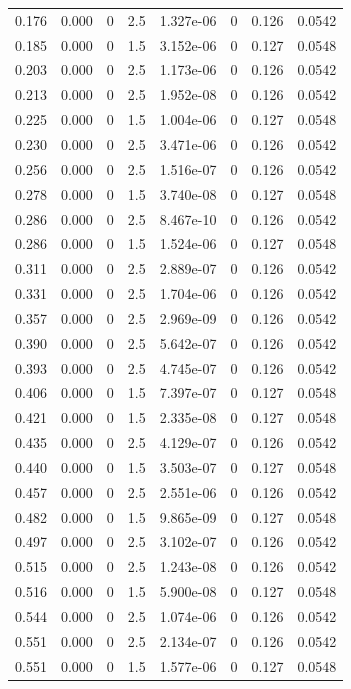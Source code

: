 \documentclass[preview]{standalone}
\begin{document}
{{\begin{tabular}{L{1.2cm}C{1.2cm} C{0.3cm}C{0.5cm} C{1.4cm}C{1.4cm} C{1.4cm}C{1.4cm}}
  0.176  &  0.000  & 0     & 2.5 &  1.327e-06  & 0  & 0.126 &  0.0542   \\ 
  0.185  &  0.000  & 0     & 1.5 &  3.152e-06  & 0  & 0.127 &  0.0548   \\ 
  0.203  &  0.000  & 0     & 2.5 &  1.173e-06  & 0  & 0.126 &  0.0542   \\ 
  0.213  &  0.000  & 0     & 2.5 &  1.952e-08  & 0  & 0.126 &  0.0542   \\ 
  0.225  &  0.000  & 0     & 1.5 &  1.004e-06  & 0  & 0.127 &  0.0548   \\ 
  0.230  &  0.000  & 0     & 2.5 &  3.471e-06  & 0  & 0.126 &  0.0542   \\ 
  0.256  &  0.000  & 0     & 2.5 &  1.516e-07  & 0  & 0.126 &  0.0542   \\ 
  0.278  &  0.000  & 0     & 1.5 &  3.740e-08  & 0  & 0.127 &  0.0548   \\ 
  0.286  &  0.000  & 0     & 2.5 &  8.467e-10  & 0  & 0.126 &  0.0542   \\ 
  0.286  &  0.000  & 0     & 1.5 &  1.524e-06  & 0  & 0.127 &  0.0548   \\ 
  0.311  &  0.000  & 0     & 2.5 &  2.889e-07  & 0  & 0.126 &  0.0542   \\ 
  0.331  &  0.000  & 0     & 2.5 &  1.704e-06  & 0  & 0.126 &  0.0542   \\ 
  0.357  &  0.000  & 0     & 2.5 &  2.969e-09  & 0  & 0.126 &  0.0542   \\ 
  0.390  &  0.000  & 0     & 2.5 &  5.642e-07  & 0  & 0.126 &  0.0542   \\ 
  0.393  &  0.000  & 0     & 2.5 &  4.745e-07  & 0  & 0.126 &  0.0542   \\ 
  0.406  &  0.000  & 0     & 1.5 &  7.397e-07  & 0  & 0.127 &  0.0548   \\ 
  0.421  &  0.000  & 0     & 1.5 &  2.335e-08  & 0  & 0.127 &  0.0548   \\ 
  0.435  &  0.000  & 0     & 2.5 &  4.129e-07  & 0  & 0.126 &  0.0542   \\ 
  0.440  &  0.000  & 0     & 1.5 &  3.503e-07  & 0  & 0.127 &  0.0548   \\ 
  0.457  &  0.000  & 0     & 2.5 &  2.551e-06  & 0  & 0.126 &  0.0542   \\ 
  0.482  &  0.000  & 0     & 1.5 &  9.865e-09  & 0  & 0.127 &  0.0548   \\ 
  0.497  &  0.000  & 0     & 2.5 &  3.102e-07  & 0  & 0.126 &  0.0542   \\ 
  0.515  &  0.000  & 0     & 2.5 &  1.243e-08  & 0  & 0.126 &  0.0542   \\ 
  0.516  &  0.000  & 0     & 1.5 &  5.900e-08  & 0  & 0.127 &  0.0548   \\ 
  0.544  &  0.000  & 0     & 2.5 &  1.074e-06  & 0  & 0.126 &  0.0542   \\ 
  0.551  &  0.000  & 0     & 2.5 &  2.134e-07  & 0  & 0.126 &  0.0542   \\ 
  0.551  &  0.000  & 0     & 1.5 &  1.577e-06  & 0  & 0.127 &  0.0548   \\ 
\hline 
\end{tabular} 

}}
\end{document}
